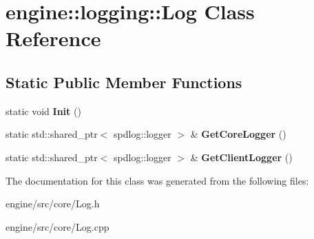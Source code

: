 \hypertarget{classengine_1_1logging_1_1Log}{}\section{engine\+:\+:logging\+:\+:Log Class Reference}
\label{classengine_1_1logging_1_1Log}
\subsection*{Static Public Member Functions}
\begin{DoxyCompactItemize}
\item 
\mbox{\label{classengine_1_1logging_1_1Log_a1364bca4f007e2931a0110f91e3e13c4}} 
static void {\bfseries Init} ()
\item 
\mbox{\label{classengine_1_1logging_1_1Log_ad54813613a17e01d3272b9fb124b049e}} 
static std\+::shared\+\_\+ptr$<$ spdlog\+::logger $>$ \& {\bfseries Get\+Core\+Logger} ()
\item 
\mbox{\label{classengine_1_1logging_1_1Log_abae59faa07a4ce0d627772e79073c67b}} 
static std\+::shared\+\_\+ptr$<$ spdlog\+::logger $>$ \& {\bfseries Get\+Client\+Logger} ()
\end{DoxyCompactItemize}


The documentation for this class was generated from the following files\+:\begin{DoxyCompactItemize}
\item 
engine/src/core/Log.\+h\item 
engine/src/core/Log.\+cpp\end{DoxyCompactItemize}
